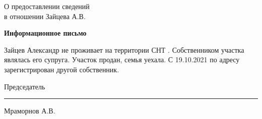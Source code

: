 \begin{flushleft}
О предоставлении сведений\\
в отношении Зайцева  А.В.
\end{flushleft}
\vspace{10mm}
\begin{center}
	\Large\textbf{Информационное письмо}
\end{center}
\par

Зайцев Александр не проживает на территории СНТ . Собственником участка являлась его супруга. Участок продан, семья уехала. С 19.10.2021   по  адресу зарегистрирован другой собственник. 

\vspace{35mm}
Председатель \hfill    \rule{4cm}{0.1 mm}    Мраморнов А.В.




